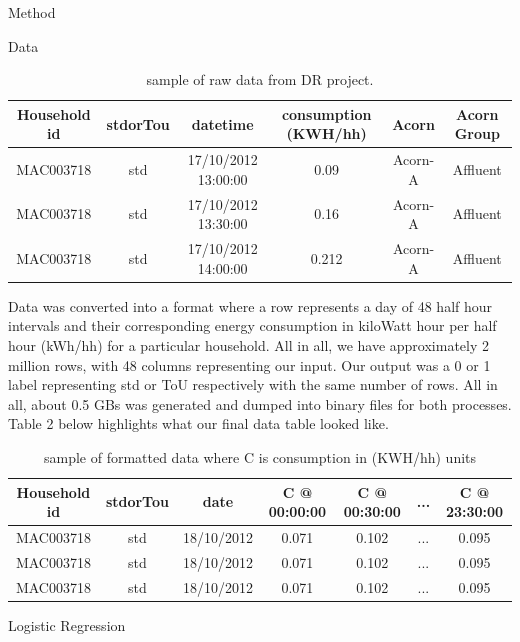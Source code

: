\documentclass[11pt]{article}
\begin{document}
\begin{section}{Method}
\begin{subsection}{Data}
		
		\begin{center}
			\begin{table}[H]
			\begin{tabular}{||c c c c c c||} 
				\hline
				Household id &  stdorTou & datetime & consumption (KWH/hh) & Acorn & Acorn Group \\ [0.5ex] 
				\hline\hline
				MAC003718 & std & 17/10/2012 13:00:00 & 0.09 & Acorn-A & Affluent \\ 
				\hline\hline
				MAC003718 & std & 17/10/2012 13:30:00 & 0.16 & Acorn-A & Affluent \\
				\hline\hline
				MAC003718 & std & 17/10/2012 14:00:00 & 0.212 & Acorn-A & Affluent  \\ [1ex] 
				\hline
			\end{tabular}
			\caption{sample of raw data from DR project.}
		\end{table}
		\end{center}
				
		Data was converted into a format where a row represents a day of 48 half hour intervals and their corresponding energy consumption in kiloWatt hour per half hour (kWh/hh) for a particular household. All in all, we have approximately 2 million rows, with 48 columns representing our input. Our output was a 0 or 1 label representing std or ToU respectively with the same number of rows. All in all, about 0.5 GBs was generated and dumped into binary files for both processes. Table 2 below highlights what our final data table looked like.
		\begin{center}
			\begin{table}[H]
				\begin{tabular}{||c c c c c c c||} 
					\hline
					Household id &  stdorTou & date & C @ 00:00:00 & C @ 00:30:00  & ... &  C @ 23:30:00 \\ [0.5ex] 
					\hline\hline
					MAC003718 & std & 18/10/2012 & 0.071 & 0.102 & ... & 0.095 \\ 
					\hline\hline
MAC003718 & std & 18/10/2012 & 0.071 & 0.102 & ... & 0.095 \\ 
					\hline\hline
MAC003718 & std & 18/10/2012 & 0.071 & 0.102 & ... & 0.095 \\ [1ex] 
					\hline
				\end{tabular}
				\caption{sample of formatted data where C is consumption in (KWH/hh) units}
			\end{table}
		\end{center}
	\end{subsection}
	\begin{subsection}{Logistic Regression}
		

\end{subsection}
\end{section}
\end{document}
